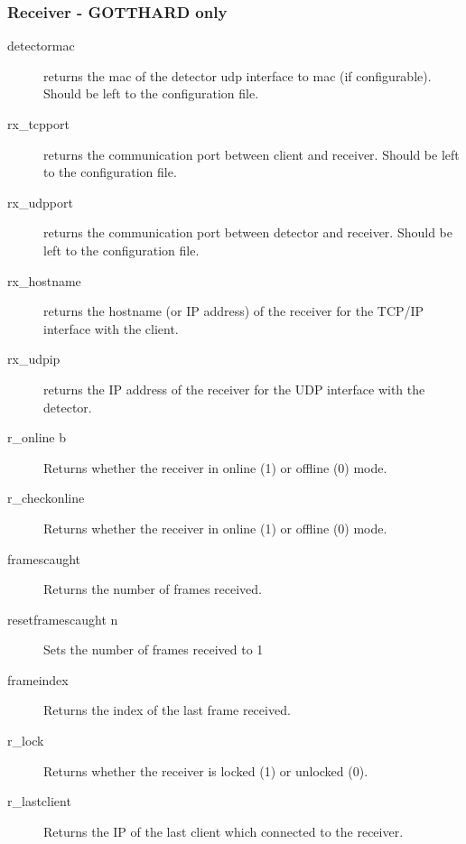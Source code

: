 \documentclass{article}
\begin{document}
\subsubsection{Receiver -  GOTTHARD only}
\begin{description}



\item[detectormac] returns the mac of the detector udp interface to mac (if configurable). Should be left to the configuration file. 
\item[rx\_tcpport] returns the communication port between client and receiver. Should be left to the configuration file. 
\item[rx\_udpport] returns the communication port between detector and receiver. Should be left to the configuration file. 
\item[rx\_hostname] returns the hostname (or IP address) of the receiver for the TCP/IP interface with the client.
\item[rx\_udpip] returns the IP address of the receiver for the UDP interface with the detector.
  
\item[r\_online b] Returns whether the receiver in online (1) or offline (0) mode.           
\item[r\_checkonline]       Returns whether the receiver in online (1) or offline (0) mode.   
\item[framescaught]       Returns the number of frames received.
\item[resetframescaught n]       Sets the number of frames received to 1
\item[frameindex]     Returns the index of the last frame received.      
\item[r\_lock] Returns whether the receiver is locked (1) or unlocked (0).   
\item[r\_lastclient]    Returns the IP of the last client which connected to the receiver. 
\end{description} 
\end{document}

